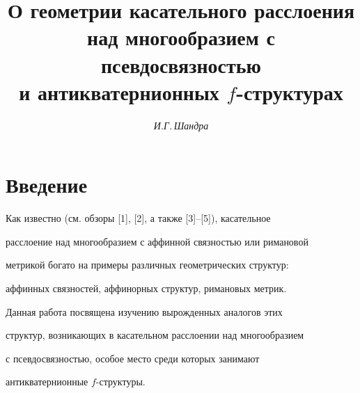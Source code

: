 

\author{\it И.Г.\,Шандра}




\title{О геометрии касательного расслоения \\


над многообразием с псевдосвязностью \\


и антикватернионных $f$-структурах}





\date{}







\pagestyle{plain} %













\maketitle


\label{begin}





\section*{Введение}





Как известно (см. обзоры [1], [2], а также [3]--[5]), касательное


расслоение над многообразием с аффинной связностью или римановой


метрикой богато на примеры различных геометрических структур:


аффинных связностей, аффинорных структур, римановых метрик.


Данная работа посвящена изучению вырожденных аналогов этих


структур, возникающих в касательном расслоении над многообразием


с псевдосвязностью, особое место среди которых занимают


антикватернионные $f$-структуры.






